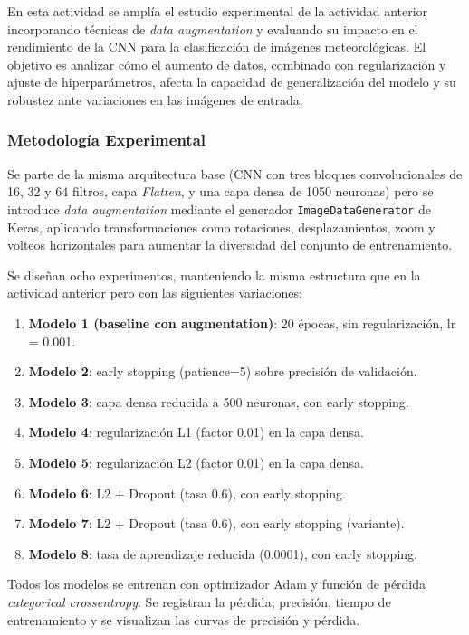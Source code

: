 \documentclass[12pt]{article}
\begin{document}
En esta actividad se amplía el estudio experimental de la actividad anterior incorporando técnicas de \textit{data augmentation} y evaluando su impacto en el rendimiento de la CNN para la clasificación de imágenes meteorológicas. El objetivo es analizar cómo el aumento de datos, combinado con regularización y ajuste de hiperparámetros, afecta la capacidad de generalización del modelo y su robustez ante variaciones en las imágenes de entrada.

\subsubsection*{Metodología Experimental}

Se parte de la misma arquitectura base (CNN con tres bloques convolucionales de 16, 32 y 64 filtros, capa \textit{Flatten}, y una capa densa de 1050 neuronas) pero se introduce \textit{data augmentation} mediante el generador \texttt{ImageDataGenerator} de Keras, aplicando transformaciones como rotaciones, desplazamientos, zoom y volteos horizontales para aumentar la diversidad del conjunto de entrenamiento.

Se diseñan ocho experimentos, manteniendo la misma estructura que en la actividad anterior pero con las siguientes variaciones:

\begin{enumerate}
    \item \textbf{Modelo 1 (baseline con augmentation)}: 20 épocas, sin regularización, lr = 0.001.
    \item \textbf{Modelo 2}: early stopping (patience=5) sobre precisión de validación.
    \item \textbf{Modelo 3}: capa densa reducida a 500 neuronas, con early stopping.
    \item \textbf{Modelo 4}: regularización L1 (factor 0.01) en la capa densa.
    \item \textbf{Modelo 5}: regularización L2 (factor 0.01) en la capa densa.
    \item \textbf{Modelo 6}: L2 + Dropout (tasa 0.6), con early stopping.
    \item \textbf{Modelo 7}: L2 + Dropout (tasa 0.6), con early stopping (variante).
    \item \textbf{Modelo 8}: tasa de aprendizaje reducida (0.0001), con early stopping.
\end{enumerate}

Todos los modelos se entrenan con optimizador Adam y función de pérdida \textit{categorical crossentropy}. Se registran la pérdida, precisión, tiempo de entrenamiento y se visualizan las curvas de precisión y pérdida.
\end{document}
